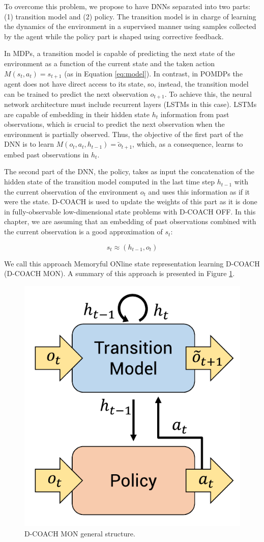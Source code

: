 To overcome this problem, we propose to have DNNs separated into two parts: (1) transition model and (2) policy. The transition model is in charge of learning the dynamics of the environment in a supervised manner using samples collected by the agent while the policy part is shaped using corrective feedback. 

In MDPs, a transition model is capable of predicting the next state of the environment as a function of the current state and the taken action $M(s_{t},a_{t}) = s_{t+1}$ (as in Equation \ref{eq:model}). In contrast, in POMDPs the agent does not have direct access to its state, so, instead, the transition model can be trained to predict the next observation $o_{t+1}$. To achieve this, the neural network architecture must include recurrent layers (LSTMs in this case). LSTMs are capable of embedding in their hidden state $h_{t}$ information from past observations, which is crucial to predict the next observation when the environment is partially observed. Thus, the objective of the first part of the DNN is to learn $M(o_{t},a_{t}, h_{t-1}) = \widetilde o_{t+1}$, which, as a consequence, learns to embed past observations in $h_{t}$.

The second part of the DNN, the policy, takes as input the concatenation of the hidden state of the transition model computed in the last time step $h_{t-1}$ with the current observation of the environment $o_{t}$ and uses this information as if it were the state. D-COACH is used to update the weights of this part as it is done in fully-observable low-dimensional state problems with D-COACH OFF. In this chapter, we are assuming that an embedding of past observations combined with the current observation is a good approximation of $s_{t}$:

\begin{equation}
s_{t}\approx (h_{t-1}, o_{t})    
\end{equation}

We call this approach Memoryful ONline state representation learning D-COACH (D-COACH MON). A summary of this approach is presented in Figure \ref{fig:mb_dcoach}.

\begin{figure}[h]
    \centering
    \includegraphics[width=0.4\linewidth]{imagenes/cap4/model_based_dcoach.pdf}
    \caption{D-COACH MON general structure.}
    \label{fig:mb_dcoach}
\end{figure}

